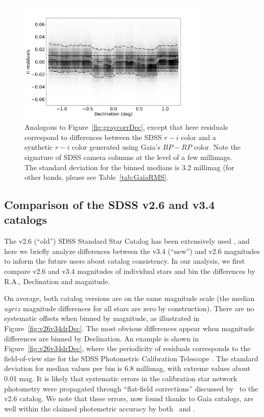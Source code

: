 \begin{figure}
    \centering\includegraphics[width=9cm]{figures/colorResidGaiaColorsB_ri_Dec_Hess.png} 
\caption{Analogous to Figure~\ref{fig:graycorrDec}, except that here residuals 
correspond to differences between the SDSS $r-i$ color and a synthetic $r-i$ color
generated using Gaia's $BP-RP$ color. Note the signature of SDSS camera columns
at the level of a few millimags. The standard deviation for the binned medians is 
3.2 millimag (for other bands, please see Table~\ref{tab:GaiaRMS}.}
\label{fig:riresid}
\end{figure}





\subsection{Comparison of the SDSS v2.6 and v3.4 catalogs \label{sec:v26v34}} 
 
The v2.6 (``old'') SDSS Standard Star Catalog has been extensively used 
\citep[e.g.,][]{2008AJ....135..338F},
and here we briefly analyze differences between the v3.4 (``new'') and v2.6 magnitudes
to inform the future users about catalog consistency. 
In our analysis, we first compare v2.6 and v3.4 magnitudes of individual stars and 
bin the differences by R.A., Declination and magnitude. 

On average, both catalog versions are on the same magnitude scale (the median $ugriz$ 
magnitude differences for all stars are zero by construction). There are no systematic offsets 
when binned by magnitude, as illustrated in Figure~\ref{fig:v26v34drDec}. The most obvious 
differences appear when magnitude differences are binned by Declination. An example is 
shown in Figure~\ref{fig:v26v34drDec}, where the periodicity of residuals corresponds to the 
field-of-view size for the SDSS Photometric Calibration Telescope \citep{2002AJ....123.2121S}. 
The standard deviation for median values per bin is 6.8 millimag, with extreme values about 
0.01 mag. It is likely that systematic errors in the calibration star network photometry 
were propagated through ``flat-field corrections'' discussed by \pO\ to the v2.6 catalog.
We note that these errors, now found thanks to Gaia catalogs, are well within the claimed
photemetric accuracy by both \pO\ and \cite{2002AJ....123.2121S}. 

